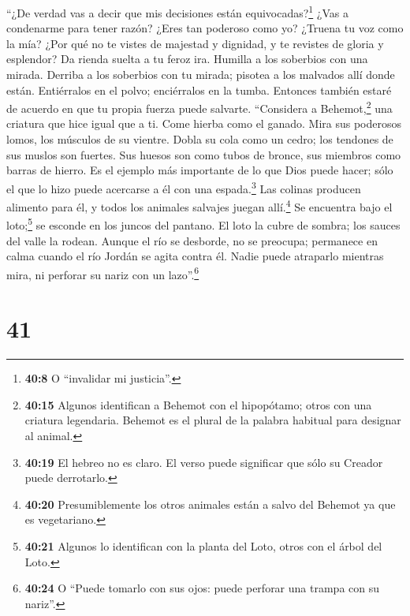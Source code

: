  ``¿De verdad vas a decir que mis decisiones están
equivocadas?\footnote{\textbf{40:8} O ``invalidar mi justicia''.} ¿Vas a
condenarme para tener razón?  ¿Eres tan poderoso como yo?
¿Truena tu voz como la mía?  ¿Por qué no te vistes de
majestad y dignidad, y te revistes de gloria y esplendor?
 Da rienda suelta a tu feroz ira. Humilla a los soberbios
con una mirada.  Derriba a los soberbios con tu mirada;
pisotea a los malvados allí donde están.  Entiérralos en
el polvo; enciérralos en la tumba.  Entonces también
estaré de acuerdo en que tu propia fuerza puede salvarte.
 ``Considera a Behemot,\footnote{\textbf{40:15} Algunos
  identifican a Behemot con el hipopótamo; otros con una criatura
  legendaria. Behemot es el plural de la palabra habitual para designar
  al animal.} una criatura que hice igual que a ti. Come hierba como el
ganado.  Mira sus poderosos lomos, los músculos de su
vientre.  Dobla su cola como un cedro; los tendones de
sus muslos son fuertes.  Sus huesos son como tubos de
bronce, sus miembros como barras de hierro.  Es el
ejemplo más importante de lo que Dios puede hacer; sólo el que lo hizo
puede acercarse a él con una espada.\footnote{\textbf{40:19} El hebreo
  no es claro. El verso puede significar que sólo su Creador puede
  derrotarlo.}  Las colinas producen alimento para él, y
todos los animales salvajes juegan allí.\footnote{\textbf{40:20}
  Presumiblemente los otros animales están a salvo del Behemot ya que es
  vegetariano.}  Se encuentra bajo el loto;\footnote{\textbf{40:21}
  Algunos lo identifican con la planta del Loto, otros con el árbol del
  Loto.} se esconde en los juncos del pantano.  El loto
la cubre de sombra; los sauces del valle la rodean. 
Aunque el río se desborde, no se preocupa; permanece en calma cuando el
río Jordán se agita contra él.  Nadie puede atraparlo
mientras mira, ni perforar su nariz con un lazo''.\footnote{\textbf{40:24}
  O ``Puede tomarlo con sus ojos: puede perforar una trampa con su
  nariz''.}

\hypertarget{section-40}{%
\section{41}\label{section-40}}

